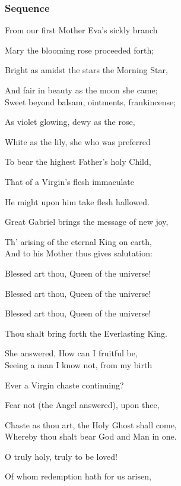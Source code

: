 \subsubsection{Sequence}
\begin{multicols}{2}
\begin{hangparas}{1.25em}{1}
From our first Mother Eva's sickly branch

Mary the blooming rose proceeded forth;

Bright as amidst the stars the Morning Star,

And fair in beauty as the moon she came;\\

Sweet beyond balsam, ointments, frankincense;

As violet glowing, dewy as the rose,

White as the lily, she who was preferred

To bear the highest Father's holy Child,

\columnbreak

That of a Virgin's flesh immaculate

He might upon him take flesh hallowed.

Great Gabriel brings the message of new joy,

Th' arising of the eternal King on earth,\\

And to his Mother thus gives salutation:

Blessed art thou, Queen of the universe!

Blessed art thou, Queen of the universe!

Blessed art thou, Queen of the universe!

Thou shalt bring forth the Everlasting King.

She answered, How can I fruitful be,\\

Seeing a man I know not, from my birth

Ever a Virgin chaste continuing?

Fear not (the Angel answered), upon thee,

Chaste as thou art, the Holy Ghost shall come,\\

Whereby thou shalt bear God and Man in one.

O truly holy, truly to be loved!

Of whom redemption hath for us arisen,


\end{hangparas}
\end{multicols}
